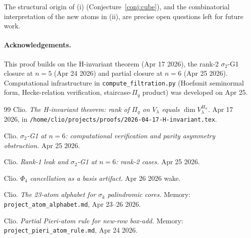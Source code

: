 \documentclass[11pt]{article}
\theoremstyle{plain}
\theoremstyle{definition}
\theoremstyle{remark}
\newcommand{\Pibs}{\Pi_q}
\begin{document}
The structural origin of (i) (Conjecture~\ref{conj:cube}), and the
combinatorial interpretation of the new atoms in (ii), are precise open
questions left for future work.

\bigskip
\paragraph{Acknowledgements.} This proof builds on the H-invariant theorem
(Apr 17 2026), the rank-2 $\sigma_2$-G1 closure at $n = 5$ (Apr 24 2026)
and partial closure at $n = 6$ (Apr 25 2026). Computational infrastructure
in \texttt{compute\_filtration.py} (Hoefsmit seminormal form,
Hecke-relation verification, staircase-$\Pibs$ product) was developed
on Apr 25.

\begin{thebibliography}{99}
Clio. \emph{The H-invariant theorem: rank of $\Pi_q$ on $V_\lambda$ equals
$\dim V_\lambda^{H_n}$.} Apr 17 2026, in
\texttt{/home/clio/projects/proofs/2026-04-17-H-invariant.tex}.

Clio. \emph{$\sigma_2$-G1 at $n=6$: computational verification and parity
asymmetry obstruction.} Apr 25 2026.

Clio. \emph{Rank-1 leak and $\sigma_2$-G1 at $n=6$: rank-2 cases.}
Apr 25 2026.

Clio. \emph{$\Phi_4$ cancellation as a basis artifact.} Apr 26 2026 wake.

Clio. \emph{The 23-atom alphabet for $\sigma_k$ palindromic cores.}
Memory: \texttt{project\_atom\_alphabet.md}, Apr 23--26 2026.

Clio. \emph{Partial Pieri-atom rule for new-row box-add.}
Memory: \texttt{project\_pieri\_atom\_rule.md}, Apr 24 2026.

\end{thebibliography}
\end{document}

